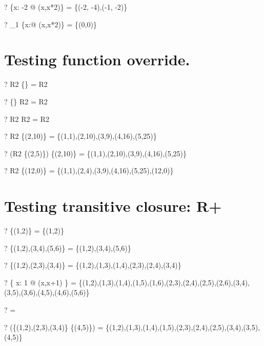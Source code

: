 \documentclass{article}
\newcommand{\negate}{-}
\begin{document}
\begin{zed} \vdash? \nat \ndres \{x: \negate 2  @ (x,x*2)\} = \{(\negate 2, \negate 4),(\negate 1, \negate 2)\} \end{zed}
\begin{zed} \vdash? \nat_1 \ndres \{x:\nat @ (x,x*2)\} = \{(0,0)\} \end{zed}


\section{Testing function override.}
\begin{zed} \vdash? R2 \oplus \{\} = R2 \end{zed}
\begin{zed} \vdash? \{\} \oplus R2 = R2 \end{zed}
\begin{zed} \vdash? R2 \oplus R2   = R2 \end{zed}
\begin{zed} \vdash? R2 \oplus \{(2,10)\} = \{(1,1),(2,10),(3,9),(4,16),(5,25)\} \end{zed}
\begin{zed} \vdash? (R2 \cup \{(2,5)\}) \oplus \{(2,10)\} = \{(1,1),(2,10),(3,9),(4,16),(5,25)\} \end{zed}
\begin{zed} \vdash? R2 \oplus \{(12,0)\} = \{(1,1),(2,4),(3,9),(4,16),(5,25),(12,0)\} \end{zed}


\section{Testing transitive closure: R+}
\begin{zed} \vdash? \{(1,2)\} \plus = \{(1,2)\} \end{zed}
\begin{zed} \vdash? \{(1,2),(3,4),(5,6)\} \plus = \{(1,2),(3,4),(5,6)\} \end{zed}
\begin{zed} \vdash? \{(1,2),(2,3),(3,4)\} \plus = \{(1,2),(1,3),(1,4),(2,3),(2,4),(3,4)\} \end{zed}
\begin{zed} \vdash? \{ x: 1  @ (x,x+1) \} \plus = \{(1,2),(1,3),(1,4),(1,5),(1,6),(2,3),(2,4),(2,5),(2,6),(3,4),(3,5),(3,6),(4,5),(4,6),(5,6)\} \end{zed}
\begin{zed} \vdash? \emptyset \plus = \emptyset[\nat,\nat] \end{zed}
\begin{zed} \vdash? (\{(1,2),(2,3),(3,4)\} \cup \{(4,5)\}) \plus = \{(1,2),(1,3),(1,4),(1,5),(2,3),(2,4),(2,5),(3,4),(3,5),(4,5)\} \end{zed}
\end{document}
